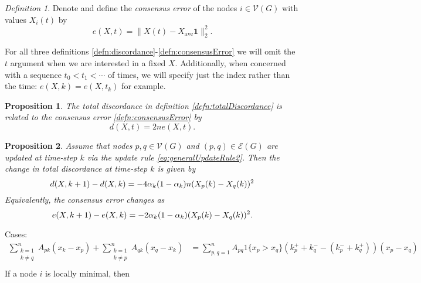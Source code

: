 \documentclass{article}
\newtheorem{proposition}{Proposition}
\theoremstyle{remark}
\newtheorem{definition}{Definition}
\begin{document}
\begin{definition}{\label{defn:consensusError}}
	Denote and define the \textit{consensus error} of the nodes $i\in\mathcal{V}(G)$ with values $X_i(t)$ by 
\begin{equation*}
	e(X,t) = \|X(t)-X_{\text{ave}}\mathbf{1}\|^2_2.
\end{equation*}
\end{definition}

For all three definitions \ref{defn:discordance}-\ref{defn:consensusError} we will omit the $t$ argument when we are interested in a fixed $X$.  Additionally, when concerned with a sequence $t_0<t_1<\cdots$ of times, we will specify just the index rather than the time: $e(X,k) = e(X,t_k)$ for example.

\begin{proposition}{\label{prop:discErrorRelationship}}
	The total discordance in definition \ref{defn:totalDiscordance} is related to the consensus error \ref{defn:consensusError} by 
\begin{equation*}
d(X,t) = 2ne(X,t).
\end{equation*}
\end{proposition}

\begin{proposition}{\label{prop:discChange}}
	Assume that nodes $p,q\in\mathcal{V}(G)$ and $(p,q)\in\mathcal{E}(G)$ are updated at time-step $k$ via the update rule \eqref{eq:generalUpdateRule2}. Then the change in total discordance at time-step $k$ is given by
\begin{equation}{\label{prop:eq:discIncrement}}
	d(X,k+1)-d(X,k) = -4\alpha_k(1-\alpha_k)n(X_p(k)-X_q(k))^2
\end{equation}
Equivalently, the consensus error changes as
\begin{equation}{\label{prop:eq:errorIncrement}}
	e(X,k+1) - e(X,k) = -2\alpha_k(1-\alpha_k)(X_p(k)-X_q(k))^2.
\end{equation}
\end{proposition}

Cases:
\begin{align*}
	\sum_{\substack{k=1\\k\neq q}}^n A_{pk}(x_k-x_p) + \sum_{\substack{k=1\\k\neq p}}^nA_{qk}(x_q-x_k) &= \sum_{p,q=1}^nA_{pq}1\{x_p>x_q\}(k_p^++k_q^--(k_p^-+k_q^+))(x_p-x_q)\\
\end{align*}
If a node $i$ is locally minimal, then
\end{document}
